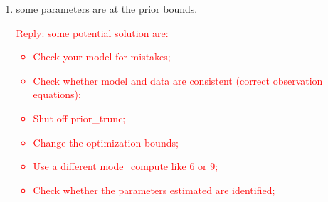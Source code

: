 \documentclass[cn,10pt,math=newtx,citestyle=gb7714-2015,bibstyle=gb7714-2015]{elegantbook}
\begin{document}
{{\begin{enumerate}
		\textcolor{red}{Reply: In Dynare we do not use the Hessian matrices returned by the optimizers. For instance, mode\_compute=4, the default algorithm derived from Chris Sims code, returns a crude estimate of the Hessian that is not used by Dynare (see any presentation of the BFGS, there is nice page on wikipedia, algorithm which is close to what is done here). Instead we compute the Hessian with finite difference (expect mode\_compute=6 and mode\_compute=5 which uses a gradient the outer product approach), by calling hessian.m function.\\
			The main culprit is that the optimization routine failed in finding a (local) minimum of minus the likelihood (or posterior kernel). That's why you need to play with other optimization routine and/or the initial guesses. Another culprit, may be the noise in the objective function. In this case you have to change the length of the steps in the finite difference routine (controlled by options\_.gstep).\\
			Two additional issue are:
			\begin{itemize}
				\item the Hessian only needs to be positive definite at an interior solution. If you have a corner solution, i.e. you are at the bound of your prior parameter space, there will be a problem.
				\item if a parameter is not identified or if there is collinearity in the jacobian of the likelihood, the Hessian will also be non-positive definite.\\
				That is why a look at the mode\_check plots is often revealing to see many pathological issues simply due to the finite difference approximation to the Hessian.
			\end{itemize}
		}
		\item some parameters are at the prior bounds.\\
		\textcolor{red}{Reply: some potential solution are:
			\begin{itemize}
				\item Check your model for mistakes;
				\item Check whether model and data are consistent (correct observation equations);
				\item Shut off prior\_trunc;
				\item Change the optimization bounds;
				\item Use a different mode\_compute like 6 or 9;
				\item Check whether the parameters estimated are identified;

\end{itemize}}
\end{enumerate}}}
\end{document}
